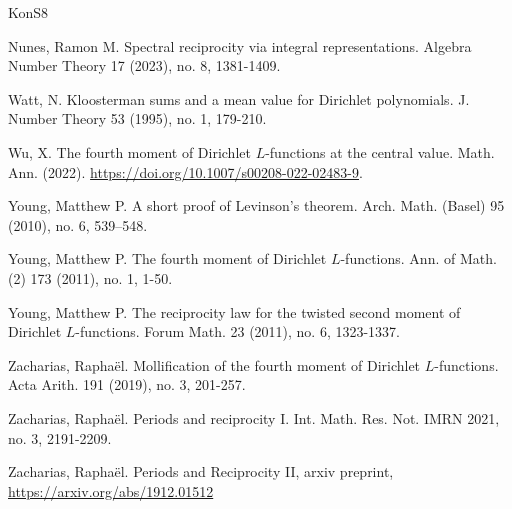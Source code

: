 \documentclass[11pt,reqno]{amsart}
\theoremstyle{definition}
\theoremstyle{definition}
\theoremstyle{remark}
\numberwithin{equation}{section}
\begin{document}
\begin{thebibliography}{KonS8}
	
	Nunes, Ramon M. Spectral reciprocity via integral representations. Algebra Number Theory 17 (2023), no. 8, 1381-1409.

	

	
	 

	

	
	Watt, N. Kloosterman sums and a mean value for Dirichlet polynomials. J. Number Theory 53 (1995), no. 1, 179-210.
	
	Wu, X. The fourth moment of Dirichlet $L$-functions at the central value. Math. Ann. (2022). \url{https://doi.org/10.1007/s00208-022-02483-9}. 




Young, Matthew P. A short proof of Levinson's theorem. Arch. Math. (Basel) 95 (2010), no. 6, 539–548.

 Young, Matthew P. The fourth moment of Dirichlet $L$-functions. Ann. of Math. (2) 173 (2011), no. 1, 1-50.
 
 
 Young, Matthew P. The reciprocity law for the twisted second moment of Dirichlet $L$-functions. Forum Math. 23 (2011), no. 6, 1323-1337.

 
 

Zacharias, Rapha\"el. Mollification of the fourth moment of Dirichlet $L$-functions. Acta Arith. 191 (2019), no. 3, 201-257. 


	Zacharias, Rapha\"{e}l. Periods and reciprocity I. Int. Math. Res. Not. IMRN 2021, no. 3, 2191-2209.
	
	Zacharias, Rapha\"{e}l.  Periods and Reciprocity II, arxiv preprint, \url{https://arxiv.org/abs/1912.01512}
	

\end{thebibliography}





\ \\
\end{document}
